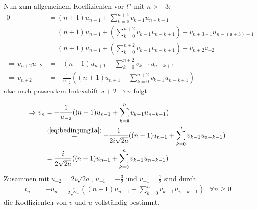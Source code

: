 Nun zum allgemeinem Koeffizienten vor $t^{n}$ mit $n>-3$:
\begin{align*}
0&= (n+1)u_{n+1} + \sum_{k=0}^{n+3} v_{k-1}u_{n-k+1}
\\&= (n+1)u_{n+1} + (\sum_{k=0}^{n+2} v_{k-1}u_{n-k+1})
  + v_{n+3-1}u_{n-(n+3)+1}
\\&= (n+1)u_{n+1} + (\sum_{k=0}^{n+2} v_{k-1}u_{n-k+1}) + v_{n+2}u_{-2}
\\\Rightarrow v_{n+2}u_{-2}&=-(n+1)u_{n+1} - \sum_{k=0}^{n+2} v_{k-1}u_{n-k+1}
\\\Rightarrow v_{n+2} &= - \frac{1}{u_{-2}}
  ((n+1)u_{n+1} + \sum_{k=0}^{n+2} v_{k-1}u_{n-k+1})
\end{align*}
also nach passendem Indexshift $n+2\rightarrow n$ folgt
\begin{comment} TODO: mapsto pfeil?  \end{comment}
\begin{align*}
\Rightarrow v_{n} &= - \frac{1}{u_{-2}}
  ((n-1)u_{n-1} + \sum_{k=0}^{n} v_{k-1}u_{n-k-1})
\\&\overset{(\ref{eq:bedingung1a})}{=} - \frac{1}{2i\sqrt{2a}}
  ((n-1)u_{n-1} + \sum_{k=0}^{n} v_{k-1}u_{n-k-1})
\\&= \frac{i}{2\sqrt{2a}}
  ((n-1)u_{n-1} + \sum_{k=0}^{n} v_{k-1}u_{n-k-1})
\end{align*}
Zusammen mit $u_{-2}=2i\sqrt{2a}$, $u_{-1}=-\frac{3}{2}$ und
$v_{-1}=\frac{1}{2}$ sind durch
\begin{align} \label{eq:induktiveFormel}
v_n &= - u_n = \frac{i}{2\sqrt{2a}}
  ((n-1)u_{n-1} + \sum_{k=0}^{n} v_{k-1}u_{n-k-1}) & \forall n \geq 0
\end{align}
die Koeffizienten von $v$ und $u$ vollständig bestimmt.

